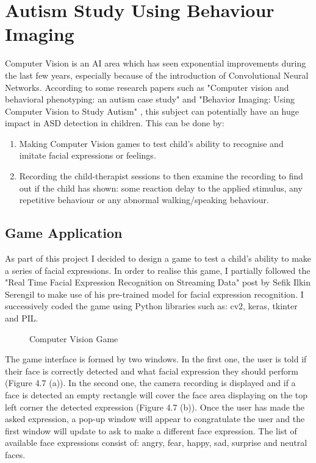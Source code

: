 \section{Autism Study Using Behaviour Imaging}
Computer Vision is an AI area which has seen exponential improvements during the last few years, especially because of the introduction of Convolutional Neural Networks. According to some research papers such as "Computer vision and behavioral phenotyping: an autism case study" \cite{visionpaper1} and "Behavior Imaging: Using Computer Vision to Study Autism" \cite{visionpaper2}, this subject can potentially have an huge impact in ASD detection in children. This can be done by: 
\begin{enumerate}
\itemsep0em
\item Making Computer Vision games to test child's ability to recognise and imitate facial expressions or feelings.
\item Recording the child-therapist sessions to then examine the recording to find out if the child has shown: some reaction delay to the applied stimulus, any repetitive behaviour or any abnormal walking/speaking behaviour.
\end{enumerate}

\subsection{Game Application}
As part of this project I decided to design a game to test a child's ability to make a series of facial expressions. In order to realise this game, I partially followed the "Real Time Facial Expression Recognition on Streaming Data" post by Sefik Ilkin Serengil \cite{visiongame} to make use of his pre-trained model for facial expression recognition. I successively coded the game using Python libraries such as: cv2, keras, tkinter and PIL.

\begin{figure}[ht!]%
    \centering
    \qquad
    \caption{Computer Vision Game}%
    \label{fig:example2}%
\end{figure}

The game interface is formed by two windows. In the first one, the user is told if their face is correctly detected and what facial expression they should perform (Figure 4.7 (a)). In the second one, the camera recording is displayed and if a face is detected an empty rectangle will cover the face area displaying on the top left corner the detected expression (Figure 4.7 (b)). Once the user has made the asked expression, a pop-up window will appear to congratulate the user and the first window will update to ask to make a different face expression. The list of available face expressions consist of: angry, fear, happy, sad, surprise and neutral faces.
